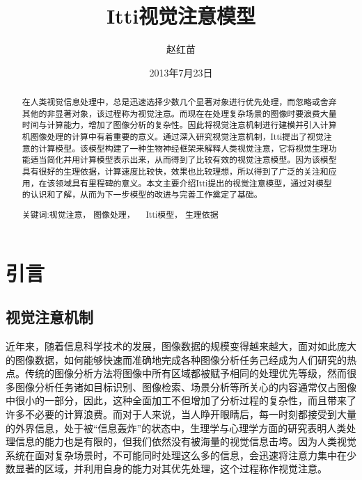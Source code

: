 \documentclass[a4paper,10pt]{article}\large
\title{Itti视觉注意模型}
\author{赵红苗}
\date{2013年7月23日}
\begin{document}
\maketitle

\begin{abstract} 

在人类视觉信息处理中，总是迅速选择少数几个显著对象进行优先处理，而忽略或舍弃其他的非显著对象，该过程称为视觉注意。而现在在处理复杂场景的图像时要浪费大量时间与计算能力，增加了图像分析的复杂性。因此将视觉注意机制进行建模并引入计算机图像处理的计算中有着重要的意义。通过深入研究视觉注意机制，Itti提出了视觉注意的计算模型。该模型构建了一种生物神经框架来解释人类视觉注意，它将视觉生理功能适当简化并用计算模型表示出来，从而得到了比较有效的视觉注意模型。因为该模型具有很好的生理依据，计算速度比较快，效果也比较理想，所以得到了广泛的关注和应用，在该领域具有里程碑的意义。本文主要介绍Itti提出的视觉注意模型，通过对模型的认识和了解，从而为下一步模型的改进与完善工作奠定了基础。


\begin{description}
\item[关键词:视觉注意，  图像处理，  　Itti模型，  生理依据]
\end{description}

\end{abstract}

\newpage
\tableofcontents 
\newpage
\section{引言}
\subsection{视觉注意机制}

近年来，随着信息科学技术的发展，图像数据的规模变得越来越大，面对如此庞大的图像数据，如何能够快速而准确地完成各种图像分析任务己经成为人们研究的热点。传统的图像分析方法将图像中所有区域都被赋予相同的处理优先等级，然而很多图像分析任务诸如目标识别、图像检索、场景分析等所关心的内容通常仅占图像中很小的一部分，因此，这种全面加工不但增加了分析过程的复杂性，而且带来了许多不必要的计算浪费。而对于人来说，当人睁开眼睛后，每一时刻都接受到大量的外界信息，处于被“信息轰炸”的状态中，生理学与心理学方面的研究表明人类处理信息的能力也是有限的，但我们依然没有被海量的视觉信息击垮。因为人类视觉系统在面对复杂场景时，不可能同时处理这么多的信息，会迅速将注意力集中在少数显著的区域，并利用自身的能力对其优先处理，这个过程称作视觉注意。
\end{document}

